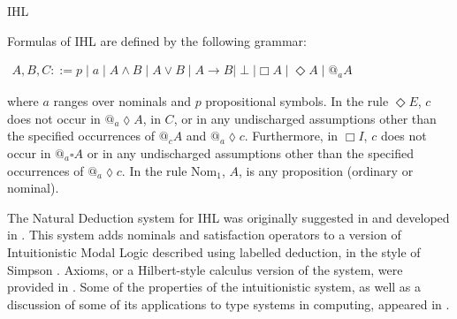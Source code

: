 \begin{entry}{IHL}
\begin{clarifications}
  Formulas of IHL are defined by the following grammar:
  \begin{center} 
    \begin{math}
      \begin{array}{lll}
        A,B,C ::= p \mid a \mid A \land B \mid A \lor B \mid A \rightarrow B \mid \perp \mid \Box A \mid \Diamond A \mid @_a A
      \end{array}
    \end{math}
  \end{center}
  where $a$ ranges over nominals and $p$ propositional symbols. In the
  rule $\Diamond E$, $c$ does not occur in $@_a \lozenge A $, in $C$,
  or in any undischarged assumptions other than the specified
  occurrences of $@_c A$ and $@_a \lozenge c $.  Furthermore, in $\Box
  I$, $c$ does not occur in $@_a \square A $ or in any undischarged
  assumptions other than the specified occurrences of $@_a \lozenge
  c$.  In the rule $\text{Nom}_1$, $A$, is any proposition (ordinary
  or nominal).
\end{clarifications}

\begin{history}
The Natural Deduction system for IHL was originally suggested in
\cite{braunerdepaiva2003} and developed in \cite{braunerdepaiva2006}.
This system adds nominals and satisfaction operators to a version of
Intuitionistic Modal Logic described using labelled deduction, in the
style of Simpson \cite{simpson1994}.  Axioms, or a Hilbert-style
calculus version of the system, were provided in \cite{brauner2006}.
Some of the properties of the intuitionistic system, as well as a
discussion of some of its applications to type systems in computing,
appeared in \cite{brauner2011}.
\end{history}


\end{entry}
